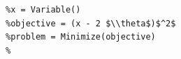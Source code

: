 \documentclass[border=10pt]{standalone}
\begin{document}
\begin{lstlisting}
%x = Variable()
%objective = (x - 2 $\\theta$)$^2$
%problem = Minimize(objective)
%
\end{lstlisting}
\end{document}
